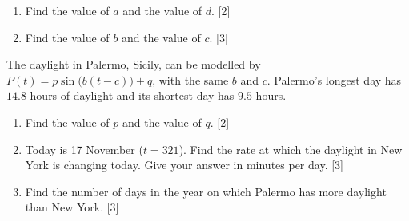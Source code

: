 \documentclass[12pt, twoside]{article}
\begin{document}
\begin{enumerate}[itemsep=0.15cm]
\begin{enumerate}[itemsep=0.15cm]
  \item Find the value of $a$ and the value of $d$. \hfill [2]
  \item Find the value of $b$ and the value of $c$. \hfill [3]
\end{enumerate}

The daylight in Palermo, Sicily, can be modelled by
$P(t) = p\sin\bigl(b(t - c)\bigr) + q$, with the same $b$ and $c$. Palermo's
longest day has $14.8$ hours of daylight and its shortest day has $9.5$
hours.

\begin{enumerate}[itemsep=0.15cm]
  \item[(c)] Find the value of $p$ and the value of $q$. \hfill [2]
  \item[(d)] Today is 17 November ($t = 321$). Find the rate at which the
  daylight in New York is changing today. Give your answer in minutes per
  day. \hfill [3]
  \item[(e)] Find the number of days in the year on which Palermo has more
  daylight than New York. \hfill [3]
\end{enumerate}

\end{enumerate}
\end{document}
